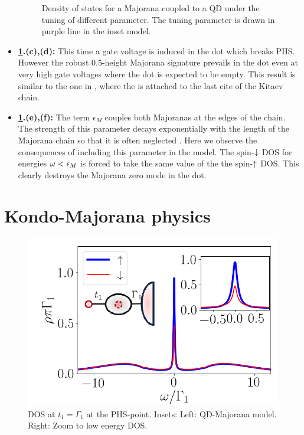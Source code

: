 \begin{itemize}
\begin{figure}[h]
     \caption{Density of states for a Majorana coupled to a QD under the tuning of different parameter. The tuning parameter is drawn in purple line in the inset model.  \label{fig:M1-Tot} \protect\Source{   }}
\end{figure}

  
    \item\textbf{ \ref{fig:M1-Tot}.(c),(d):} This time a gate voltage is induced in the dot which breaks PHS. However the robust $0.5$-height Majorana signature prevails in the dot even at very high gate voltages where the dot is expected to be empty. This result is similar to the one in \cite{vernek_subtle_2014}, where the is attached to the last cite of the Kitaev chain.
    
    \item\textbf{ \ref{fig:M1-Tot}.(e),(f):} The term $\epsilon_M$ couples both Majoranas at the edges of the chain. The strength of this parameter decays exponentially with the length of the Majorana  chain so that it is often neglected . Here we observe the consequences of including this parameter in the model. The spin-$\downarrow$ DOS for energies $\omega < \epsilon_M$ is forced to take the same value of the the spin-$\uparrow$ DOS. This clearly destroys the Majorana zero mode in the dot.   
\end{itemize}







\section{Kondo-Majorana physics}
\begin{figure}[t]
\centering
\includegraphics[scale=0.6]{IMAGES/Majorana/NRG_M1.png}
\caption{ \label{fig:NRG-1M} DOS at $t_1 = \Gamma_1$ at the PHS-point.  Insets: Left: QD-Majorana model. Right: Zoom to low energy DOS. \protect{}}
\end{figure}

